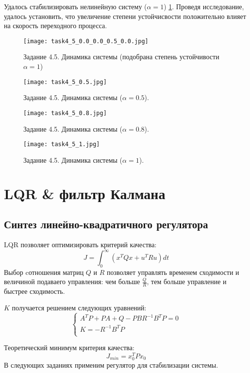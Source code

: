 Удалось стабилизировать нелинейную систему ($\alpha = 1$) \ref{fig:task4_5}.
Проведя исследование, удалось установить, что увеличение степени устойчисвости положительно влияет на скорость переходного процесса.
\begin{figure}[]
    \centering
    \texttt{[image: task4\_5\_0.0\_0.0\_0.5\_0.0.jpg]}
    \caption{Задание 4.5. Динамика системы (подобрана степень устойчивости $\alpha=1$)}
    \label{fig:task4_5}
\end{figure}
\begin{figure}[]
    \centering
    \texttt{[image: task4\_5\_0.5.jpg]}
    \caption{Задание 4.5. Динамика системы ($\alpha=0.5$).}
    \label{fig:task4_5_1}
\end{figure}
\begin{figure}[]
    \centering
    \texttt{[image: task4\_5\_0.8.jpg]}
    \caption{Задание 4.5. Динамика системы ($\alpha=0.8$).}
    \label{fig:task4_5_2}
\end{figure}
\begin{figure}[]
    \centering
    \texttt{[image: task4\_5\_1.jpg]}
    \caption{Задание 4.5. Динамика системы ($\alpha=1$).}
    \label{fig:task4_5_3}
\end{figure}


\section{LQR \& фильтр Калмана}
\subsection{Синтез линейно-квадратичного регулятора}
LQR позволяет оптимизировать критерий качества:
\[J = \int_0^\infty (x^T Q x + u^T R u)dt \]
Выбор cотношения матриц \(Q\) и \(R\) позволяет управлять временем сходимости и величиной подаваего управления: чем больше \(\frac{Q}{R}\), тем больше управление и быстрее сходимость.

\(K\) получается решением следующих уравнений:
    \begin{equation}
        \begin{cases}
            A^T P + P A + Q - PBR^{-1}B^TP = 0\\
            K = -R^{-1} B^T P \\
        \end{cases}
    \end{equation}

Теоретический минимум критерия качества:
\[J_{min} = x_0^T P x_0\]
В следующих заданиях применим регулятор для стабилизации системы.

